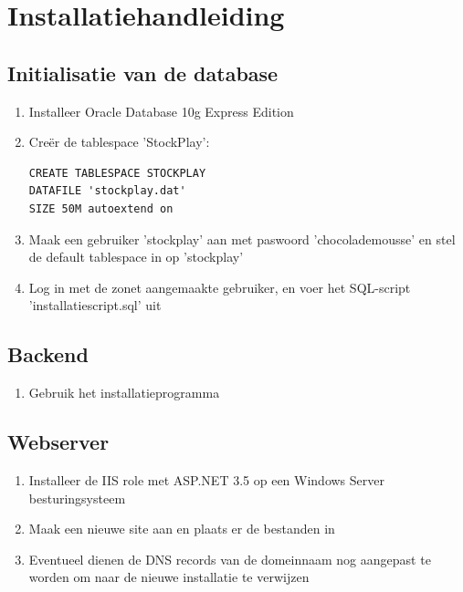 %
%

\section{Installatiehandleiding}

\subsection{Initialisatie van de database}

\begin{enumerate}
\item{Installeer Oracle Database 10g Express Edition}
\item{Cre\"er de tablespace 'StockPlay': 
\begin{verbatim}
CREATE TABLESPACE STOCKPLAY 
DATAFILE 'stockplay.dat' 
SIZE 50M autoextend on
\end{verbatim}
}
\item{Maak een gebruiker 'stockplay' aan met paswoord 'chocolademousse' en stel de default tablespace in op 'stockplay'}
\item{Log in met de zonet aangemaakte gebruiker, en voer het SQL-script 'installatiescript.sql' uit}
\end{enumerate}


\subsection{Backend}

\begin{enumerate}
\item{Gebruik het installatieprogramma}
\end{enumerate}

\subsection{Webserver}

\begin{enumerate}
\item{Installeer de IIS role met ASP.NET 3.5 op een Windows Server besturingsysteem}
\item{Maak een nieuwe site aan en plaats er de bestanden in}
\item{Eventueel dienen de DNS records van de domeinnaam nog aangepast te worden om naar de nieuwe installatie te verwijzen}
\end{enumerate}

